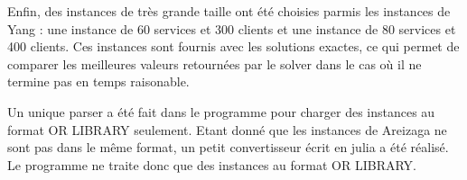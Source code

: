 Enfin, des instances de très grande taille ont été choisies parmis les instances de Yang : une instance de 60 services et 300 clients et une instance de 80 services et 400 clients.
Ces instances sont fournis avec les solutions exactes, ce qui permet de comparer les meilleures valeurs retournées par le solver dans le cas où il ne termine pas en temps raisonable. \newline

Un unique parser a été fait dans le programme pour charger des instances au format OR LIBRARY seulement.
Etant donné que les instances de Areizaga ne sont pas dans le même format, un petit convertisseur écrit en julia a été réalisé. Le programme ne traite donc que des instances au format OR LIBRARY.
